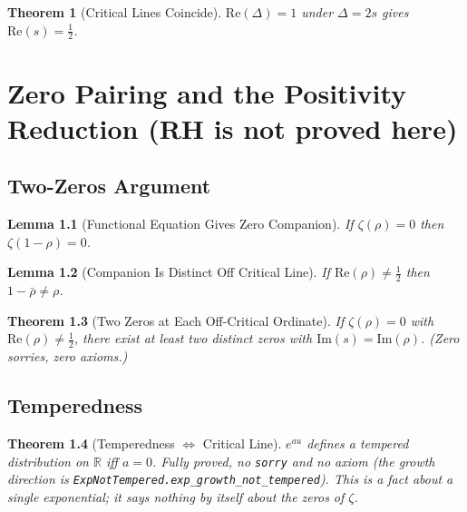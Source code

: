 \documentclass{report}
\newtheorem{theorem}{Theorem}[chapter]
\newtheorem{lemma}[theorem]{Lemma}
\theoremstyle{definition}
\begin{document}
\begin{theorem}[Critical Lines Coincide]
  \label{thm:critical-lines}
  \leanok
  $\mathrm{Re}(\Delta) = 1$ under $\Delta = 2s$ gives $\mathrm{Re}(s) = \tfrac{1}{2}$.
\end{theorem}

\chapter{Zero Pairing and the Positivity Reduction (RH is not proved here)}

\section{Two-Zeros Argument}

\begin{lemma}[Functional Equation Gives Zero Companion]
  \label{lem:zeta-fe-zero}
  \leanok
  If $\zeta(\rho) = 0$ then $\zeta(1-\rho) = 0$.
\end{lemma}

\begin{lemma}[Companion Is Distinct Off Critical Line]
  \label{lem:companion-distinct}
  \leanok
  If $\mathrm{Re}(\rho) \neq \tfrac{1}{2}$ then $1-\bar\rho \neq \rho$.
\end{lemma}

\begin{theorem}[Two Zeros at Each Off-Critical Ordinate]
  \label{thm:two-zeros}
  \leanok
  If $\zeta(\rho) = 0$ with $\mathrm{Re}(\rho) \neq \tfrac{1}{2}$,
  there exist at least two distinct zeros with $\mathrm{Im}(s) = \mathrm{Im}(\rho)$.
  \emph{(Zero sorries, zero axioms.)}
\end{theorem}

\section{Temperedness}

\begin{theorem}[Temperedness $\Leftrightarrow$ Critical Line]
  \label{thm:temperedness}
  \leanok
  $e^{au}$ defines a tempered distribution on $\mathbb{R}$ iff $a=0$.
  Fully proved, no \texttt{sorry} and no axiom (the growth direction is
  \texttt{ExpNotTempered.exp\_growth\_not\_tempered}). This is a fact about a single
  exponential; it says nothing by itself about the zeros of $\zeta$.
\end{theorem}
\end{document}
